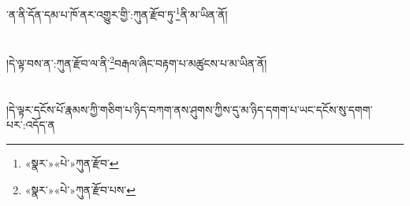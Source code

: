 ་ན་ནི་དོན་དམ་པ་ཁོ་ནར་འགྱུར་གྱི་:ཀུན་རྫོབ་ཏུ་\footnote{«སྣར་»«པེ་»ཀུན་རྫོབ་}ནི་མ་ཡིན་ནོ།\chapter{ }།དེ་ལྟ་བས་ན་:ཀུན་རྫོབ་ལ་ནི་\footnote{«སྣར་»«པེ་»ཀུན་རྫོབ་པས་}བརྒལ་ཞིང་བརྟག་པ་མཚུངས་པ་མ་ཡིན་ནོ།\chapter{ }།དེ་ལྟར་དངོས་པོ་རྣམས་ཀྱི་གཅིག་པ་ཉིད་བཀག་ནས་ཤུགས་ཀྱིས་དུ་མ་ཉིད་དགག་པ་ཡང་དངོས་སུ་དགག་པར་:འདོད་ན